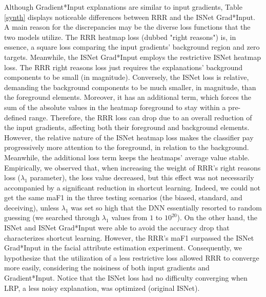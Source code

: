 \documentclass[fleqn,10pt]{wlscirep}
\begin{document}
{Although Gradient*Input explanations are similar to input gradients\cite{LRPvsGrad}, Table \ref{synth} displays noticeable differences between RRR and the ISNet Grad*Input. A main reason for the discrepancies may be the diverse loss functions that the two models utilize. The RRR heatmap loss (dubbed "right reasons"\cite{RRR}) is, in essence, a square loss comparing the input gradients' background region and zero targets. Meanwhile, the ISNet Grad*Input employs the restrictive ISNet heatmap loss. The RRR right reasons loss just requires the explanations' background components to be small (in magnitude). Conversely, the ISNet loss is relative, demanding the background components to be much smaller, in magnitude, than the foreground elements. Moreover, it has an additional term, which forces the sum of the absolute values in the heatmap foreground to stay within a pre-defined range. Therefore, the RRR loss can drop due to an overall reduction of the input gradients, affecting both their foreground and background elements. However, the relative nature of the ISNet heatmap loss makes the classifier pay progressively more attention to the foreground, in relation to the background. Meanwhile, the additional loss term keeps the heatmaps' average value stable. Empirically, we observed that, when increasing the weight of RRR's right reasons loss ($\lambda_{1}$ parameter\cite{RRR}), the loss value decreased, but this effect was not necessarily accompanied by a significant reduction in shortcut learning. Indeed, we could not get the same maF1 in the three testing scenarios (the biased, standard, and deceiving), unless $\lambda_{1}$ was set so high that the DNN essentially resorted to random guessing (we searched through $\lambda_{1}$ values from $1$ to  $10^{20}$). On the other hand, the ISNet and ISNet Grad*Input were able to avoid the accuracy drop that characterizes shortcut learning. However, the RRR's maF1 surpassed the ISNet Grad*Input in the facial attribute estimation experiment. Consequently, we hypothesize that the utilization of a less restrictive loss allowed RRR to converge more easily, considering the noisiness of both input gradients and Gradient*Input. Notice that the ISNet loss had no difficulty converging when LRP, a less noisy explanation\cite{LRPRobustness}, was optimized (original ISNet).

}
\end{document}
